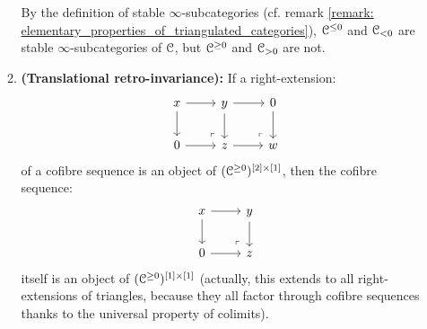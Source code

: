 \begin{definition}[t-structures]
\begin{enumerate}
\begin{enumerate}
                                By the definition of stable $\infty$-subcategories (cf. remark \ref{remark: elementary_properties_of_triangulated_categories}), $\mathcal{C}^{\leq 0}$ and $\mathcal{C}_{< 0}$ are stable $\infty$-subcategories of $\mathcal{C}$, but $\mathcal{C}^{\geq 0}$ and $\mathcal{C}_{> 0}$ are not. 
                                \item \textbf{(Translational retro-invariance):} If a right-extension:
                                    $$
                                        \begin{tikzcd}
                                        	x & y & 0 \\
                                        	0 & z & w
                                        	\arrow[from=2-1, to=2-2]
                                        	\arrow[from=1-2, to=2-2]
                                        	\arrow[from=1-1, to=1-2]
                                        	\arrow[from=1-1, to=2-1]
                                        	\arrow["\lrcorner"{anchor=center, pos=0.125, rotate=180}, draw=none, from=2-2, to=1-1]
                                        	\arrow[from=2-2, to=2-3]
                                        	\arrow[from=1-2, to=1-3]
                                        	\arrow[from=1-3, to=2-3]
                                        	\arrow["\lrcorner"{anchor=center, pos=0.125, rotate=180}, draw=none, from=2-3, to=1-2]
                                        \end{tikzcd}
                                    $$
                                of a cofibre sequence is an object of $(\C^{\geq 0})^{[2] \x [1]}$, then the cofibre sequence:
                                    $$
                                        \begin{tikzcd}
                                        	x & y \\
                                        	0 & z
                                        	\arrow[from=2-1, to=2-2]
                                        	\arrow[from=1-2, to=2-2]
                                        	\arrow[from=1-1, to=1-2]
                                        	\arrow[from=1-1, to=2-1]
                                        	\arrow["\lrcorner"{anchor=center, pos=0.125, rotate=180}, draw=none, from=2-2, to=1-1]
                                        \end{tikzcd}
                                    $$
                                itself is an object of $(\C^{\geq 0})^{[1] \x [1]}$ (actually, this extends to all right-extensions of triangles, because they all factor through cofibre sequences thanks to the universal property of colimits). 
                                

\end{enumerate}
\end{enumerate}
\end{definition}
